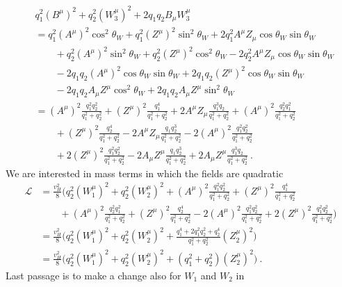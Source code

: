     \begin{equation*}
    \begin{aligned}
        & q_1^2 (B^\mu)^2 + q_2^2 (W^\mu_3)^2 + 2 q_1 q_2 B_\mu W^\mu_3 \\ & = q_1^2 (A^\mu)^2 \cos^2 \theta_W + q_1^2 (Z^\mu)^2 \sin^2 \theta_W + 2 q_1^2 A^\mu Z_\mu \cos \theta_W \sin \theta_W \\ & \qquad + q_2^2 (A^\mu)^2 \sin^2 \theta_W + q_2^2 (Z^\mu)^2 \cos^2 \theta_W - 2 q_2^2 A^\mu Z_\mu \cos \theta_W \sin \theta_W \\ & \qquad - 2 q_1 q_2 (A^\mu)^2 \cos \theta_W \sin \theta_W + 2 q_1 q_2 (Z^\mu)^2 \cos \theta_W \sin \theta_W \\ & \qquad - 2 q_1 q_2 A_\mu Z^\mu \cos^2 \theta_W + 2 q_1 q_2 A_\mu Z^\mu \sin^2 \theta_W \\ & = (A^\mu)^2 \frac{q_1^2 q_2^2}{q_1^2 + q_2^2} + (Z^\mu)^2 \frac{q_1^4}{q_1^2 + q_2^2} + 2 A^\mu Z_\mu \frac{q_1^3 q_2}{q_1^2 + q_2^2}  + (A^\mu)^2 \frac{q_2^2 q_1^2}{q_1^2 + q_2^2} \\ & \qquad + (Z^\mu)^2 \frac{q_2^4}{q_1^2 + q_2^2} - 2 A^\mu Z_\mu \frac{q_1 q_2^3}{q_1^2 + q_2^2} - 2 (A^\mu)^2 \frac{q_1^2 q_2^2}{q_1^2 + q_2^2} \\ & \qquad + 2 (Z^\mu)^2 \frac{q_1^2 q_2^2}{q_1^2 + q_2^2} - 2 A_\mu Z^\mu \frac{q_1 q_2^3}{q_1^2 + q_2^2} + 2 A_\mu Z^\mu \frac{q_1^3 q_2}{q_1^2 + q_2^2} ~.
    \end{aligned}
    \end{equation*}
    We are interested in mass terms in which the fields are quadratic 
    \begin{equation*}
    \begin{aligned}
        \mathcal L & = \frac{v_H^2}{8} \Big ( q_2^2 (W^\mu_1)^2 + q_2^2 (W^\mu_2)^2 + (A^\mu)^2 \frac{q_1^2 q_2^2}{q_1^2 + q_2^2} + (Z^\mu)^2 \frac{q_1^4}{q_1^2 + q_2^2}  \\ & \qquad + (A^\mu)^2 \frac{q_2^2 q_1^2}{q_1^2 + q_2^2} + (Z^\mu)^2 \frac{q_2^4}{q_1^2 + q_2^2} - 2 (A^\mu)^2 \frac{q_1^2 q_2^2}{q_1^2 + q_2^2} + 2 (Z^\mu)^2 \frac{q_1^2 q_2^2}{q_1^2 + q_2^2} \Big) \\ & = \frac{v_H^2}{8} \Big (q_2^2 (W^\mu_1)^2 + q_2^2 (W^\mu_2)^2 + \frac{q_1^4 + 2 q_1^2 q_2^2 + q_2^4}{q_1^2 + q_2^2} (Z^\mu_2)^2 \Big ) \\ & = \frac{v_H^2}{8} \Big (q_2^2 (W^\mu_1)^2 + q_2^2 (W^\mu_2)^2 + (q_1^2 + q_2^2) (Z^\mu_2)^2 \Big ) ~.
    \end{aligned}
    \end{equation*}
    Last passage is to make a change also for $W_1$ and $W_2$ in 
